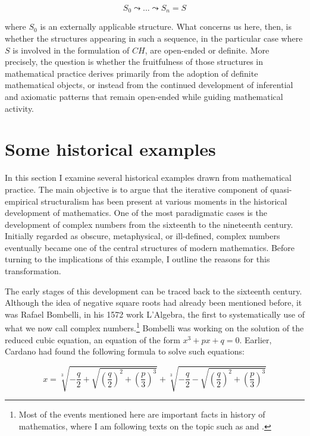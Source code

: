 \documentclass[11pt,a4paper]{book}
\theoremstyle{plain}
\begin{document}
$$ S_0 \leadsto ... \leadsto S_n = S $$

where $S_0$ is an externally applicable structure. What concerns us here, then, is whether the structures appearing in such a sequence, in the particular case where $S$ is involved in the formulation of $CH$, are open-ended or definite. More precisely, the question is whether the fruitfulness of those structures in mathematical practice derives primarily from the adoption of definite mathematical objects, or instead from the continued development of inferential and axiomatic patterns that remain open-ended while guiding mathematical activity.


\section{Some historical examples}
\label{history-section}

In this section I examine several historical examples drawn from mathematical practice. The main objective is to argue that the iterative component of quasi-empirical structuralism has been present at various moments in the historical development of mathematics. One of the most paradigmatic cases is the development of complex numbers from the sixteenth to the nineteenth century. Initially regarded as obscure, metaphysical, or ill-defined, complex numbers eventually became one of the central structures of modern mathematics. Before turning to the implications of this example, I outline the reasons for this transformation.

The early stages of this development can be traced back to the sixteenth century. Although the idea of negative square roots had already been mentioned before, it was Rafael Bombelli, in his 1572 work L’Algebra, the first to systematically use of what we now call complex numbers.\footnote{Most of the events mentioned here are important facts in history of mathematics, where I am following texts on the topic such as \textcite{Nahin2010} and \textcite{Christen2018}.} Bombelli was working on the solution of the reduced cubic equation, an equation of the form $x^3 + px + q = 0$. Earlier, Cardano had found the following formula to solve such equations:

\begin{equation}
x = \sqrt[3]{-\frac{q}{2} + \sqrt{\left(\frac{q}{2}\right)^2 + \left(\frac{p}{3}\right)^3}} 
+ \sqrt[3]{-\frac{q}{2} - \sqrt{\left(\frac{q}{2}\right)^2 + \left(\frac{p}{3}\right)^3}}
\end{equation} 
\end{document}
